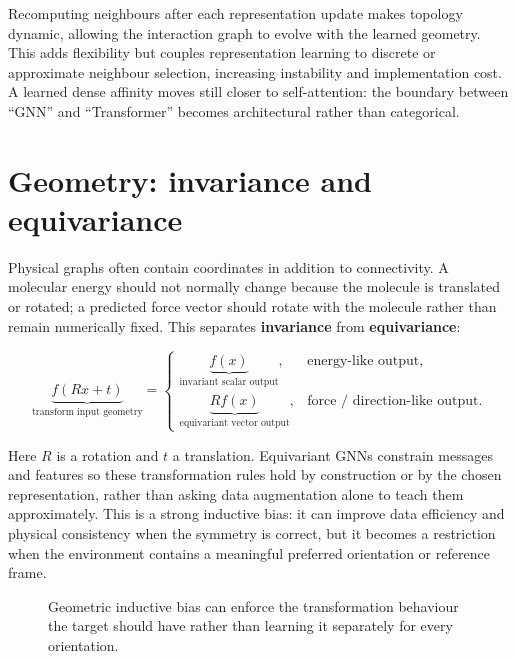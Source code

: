 Recomputing neighbours after each representation update makes topology dynamic, allowing the interaction graph to evolve with the learned geometry.
This adds flexibility but couples representation learning to discrete or approximate neighbour selection, increasing instability and implementation cost.
A learned dense affinity moves still closer to self-attention: the boundary between ``GNN'' and ``Transformer'' becomes architectural rather than categorical.

\section{Geometry: invariance and equivariance}
Physical graphs often contain coordinates in addition to connectivity.
A molecular energy should not normally change because the molecule is translated or rotated; a predicted force vector should rotate with the molecule rather than remain numerically fixed.
This separates \textbf{invariance} from \textbf{equivariance}:

\[
\underbrace{f(Rx+t)}_{\text{transform input geometry}}
=
\begin{cases}
\underbrace{f(x)}_{\text{invariant scalar output}}, & \text{energy-like output},\\[2mm]
\underbrace{R f(x)}_{\text{equivariant vector output}}, & \text{force / direction-like output}.
\end{cases}
\]

Here $R$ is a rotation and $t$ a translation.
Equivariant GNNs constrain messages and features so these transformation rules hold by construction or by the chosen representation, rather than asking data augmentation alone to teach them approximately.
This is a strong inductive bias: it can improve data efficiency and physical consistency when the symmetry is correct, but it becomes a restriction when the environment contains a meaningful preferred orientation or reference frame.

\begin{figure}[htbp]
\centering
{}
\caption{Geometric inductive bias can enforce the transformation behaviour the target should have rather than learning it separately for every orientation.}
\label{fig:gnn-equivariance}
\end{figure}

